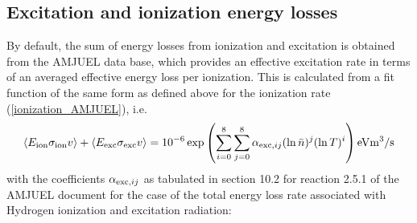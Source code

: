\documentclass[amsmath,amssymb,a4]{revtex4-2}
\begin{document}
\subsection{Excitation and ionization energy losses}

By default, the sum of energy losses from ionization and excitation is obtained from the AMJUEL data base, which provides an effective excitation rate in terms of an averaged effective energy loss per ionization. This is calculated from a fit function of the same form as defined above for the ionization rate (\ref{ionization_AMJUEL}), i.e.
\begin{equation}
  \langle E_{\rm ion} \sigma_{\rm ion} v\rangle + \langle E_{\rm exc} \sigma_{\rm exc} v\rangle =  10^{-6} \exp\left( \sum_{i=0}^8\sum_{j=0}^8 \alpha_{{\rm exc,} ij} (\ln \bar n)^j (\ln T)^i \right)  {\rm eV} {\rm m}^3/{\rm s}
\end{equation}
with the coefficients $\alpha_{{\rm exc,} ij}$ as tabulated in section 10.2 for reaction 2.5.1 of the AMJUEL document for the case of the total energy loss rate associated with Hydrogen ionization and excitation radiation:
\end{document}
